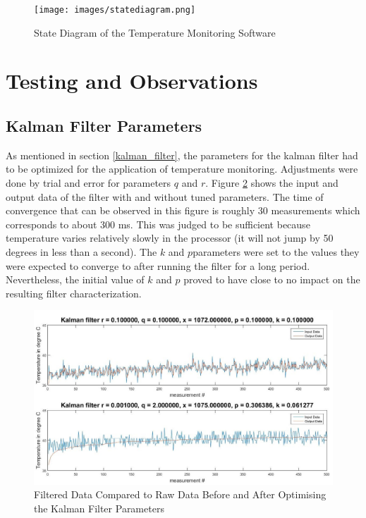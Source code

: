 \documentclass[12pt]{article}
\begin{document}
\begin{figure}[!htb]
\centering
\texttt{[image: images/statediagram.png]}
\caption{State Diagram of the Temperature Monitoring Software}
\label{fig:statediagram}
\end{figure}


\section{Testing and Observations}

\subsection{Kalman Filter Parameters}\label{kalman_filter_params}
As mentioned in section \ref{kalman_filter}, the parameters for the kalman filter had to be optimized for the application of temperature monitoring. Adjustments were done by trial and error for parameters $q$ and $r$. Figure \ref{fig:kalmanfilter} shows the input and output data of the filter with and without tuned parameters. The time of convergence that can be observed in this figure is roughly 30 measurements which corresponds to about 300 ms. This was judged to be sufficient because temperature varies relatively slowly in the processor (it will not jump by 50 degrees in less than a second). The $k$ and $p $parameters were set to the values they were expected to converge to after running the filter for a long period. Nevertheless, the initial value of $k$ and $p$ proved to have close to no impact on the resulting filter characterization.
\begin{figure}[!htb]
\centering
\includegraphics[scale=0.50]{images/kalmanfilter.jpg}
\caption{Filtered Data Compared to Raw Data Before and After Optimising the Kalman Filter Parameters}
\label{fig:kalmanfilter}
\end{figure}
\end{document}
